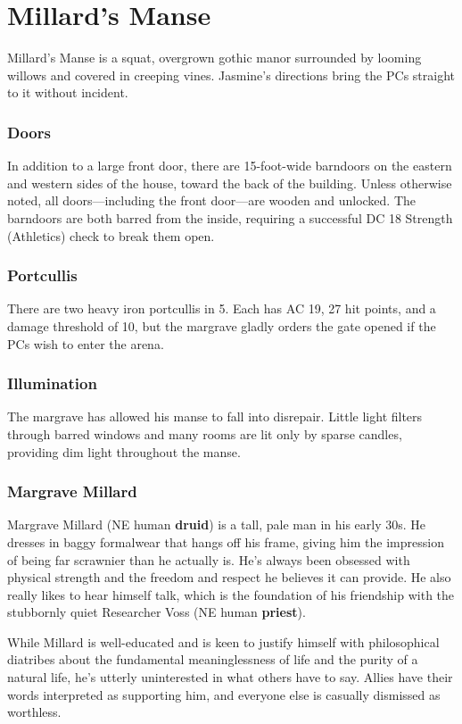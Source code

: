 \documentclass[10pt,a4paper,twoside,bg=print,twocolumn,openany,nodeprecatedcode]{dndbook}
\begin{document}
\section{Millard's Manse}
Millard's Manse is a squat, overgrown gothic manor surrounded by looming willows and covered in creeping vines. Jasmine's directions bring the PCs straight to it without incident.

\subsubsection{Doors}
In addition to a large front door, there are 15-foot-wide barndoors on the eastern and western sides of the house, toward the back of the building. Unless otherwise noted, all doors—including the front door—are wooden and unlocked. The barndoors are both barred from the inside, requiring a successful DC 18 Strength (Athletics) check to break them open.

\subsubsection{Portcullis}
There are two heavy iron portcullis in 5. Each has AC 19, 27 hit points, and a damage threshold of 10, but the margrave gladly orders the gate opened if the PCs wish to enter the arena.

\subsubsection{Illumination}
The margrave has allowed his manse to fall into disrepair. Little light filters through barred windows and many rooms are lit only by sparse candles, providing dim light throughout the manse.

\subsubsection{Margrave Millard}
Margrave Millard (NE human \textbf{druid}) is a tall, pale man in his early 30s. He dresses in baggy formalwear that hangs off his frame, giving him the impression of being far scrawnier than he actually is. He's always been obsessed with physical strength and the freedom and respect he believes it can provide. He also really likes to hear himself talk, which is the foundation of his friendship with the stubbornly quiet Researcher Voss (NE human \textbf{priest}).

While Millard is well-educated and is keen to justify himself with philosophical diatribes about the fundamental meaninglessness of life and the purity of a natural life, he's utterly uninterested in what others have to say. Allies have their words interpreted as supporting him, and everyone else is casually dismissed as worthless.
\end{document}
